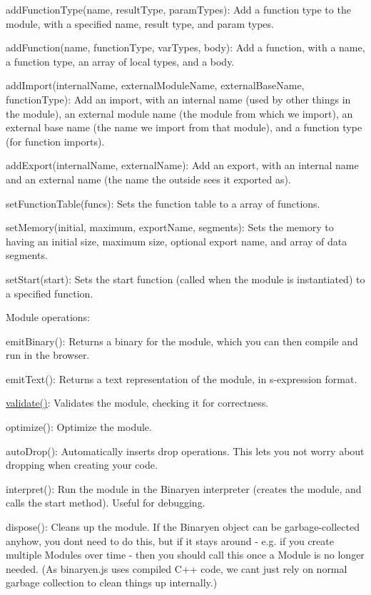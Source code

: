 \begin{DoxyItemize}
\item {\ttfamily add\+Function\+Type(name, result\+Type, param\+Types)}\+: Add a function type to the module, with a specified name, result type, and param types.
\item {\ttfamily add\+Function(name, function\+Type, var\+Types, body)}\+: Add a function, with a name, a function type, an array of local types, and a body.
\item {\ttfamily add\+Import(internal\+Name, external\+Module\+Name, external\+Base\+Name, function\+Type)}\+: Add an import, with an internal name (used by other things in the module), an external module name (the module from which we import), an external base name (the name we import from that module), and a function type (for function imports).
\item {\ttfamily add\+Export(internal\+Name, external\+Name)}\+: Add an export, with an internal name and an external name (the name the outside sees it exported as).
\item {\ttfamily set\+Function\+Table(funcs)}\+: Sets the function table to a array of functions.
\item {\ttfamily set\+Memory(initial, maximum, export\+Name, segments)}\+: Sets the memory to having an initial size, maximum size, optional export name, and array of data segments.
\item {\ttfamily set\+Start(start)}\+: Sets the start function (called when the module is instantiated) to a specified function.
\end{DoxyItemize}

Module operations\+:


\begin{DoxyItemize}
\item {\ttfamily emit\+Binary()}\+: Returns a binary for the module, which you can then compile and run in the browser.
\item {\ttfamily emit\+Text()}\+: Returns a text representation of the module, in s-\/expression format.
\item {\ttfamily \mbox{\hyperlink{authority_8hpp_a98696231ed7d6f1c166797053cebc5eb}{validate()}}}\+: Validates the module, checking it for correctness.
\item {\ttfamily optimize()}\+: Optimize the module.
\item {\ttfamily auto\+Drop()}\+: Automatically inserts {\ttfamily drop} operations. This lets you not worry about dropping when creating your code.
\item {\ttfamily interpret()}\+: Run the module in the Binaryen interpreter (creates the module, and calls the start method). Useful for debugging.
\item {\ttfamily dispose()}\+: Cleans up the module. If the Binaryen object can be garbage-\/collected anyhow, you don\textquotesingle{}t need to do this, but if it stays around -\/ e.\+g. if you create multiple {\ttfamily Module}s over time -\/ then you should call this once a {\ttfamily Module} is no longer needed. (As binaryen.\+js uses compiled C++ code, we can\textquotesingle{}t just rely on normal garbage collection to clean things up internally.)
\end{DoxyItemize}

